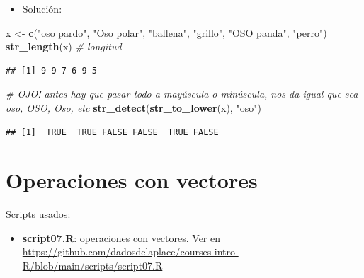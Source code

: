 \documentclass[11pt,]{book}
\newenvironment{Shaded}{\begin{snugshade}}{\end{snugshade}}
\newcommand{\CommentTok}[1]{\textcolor[rgb]{0.37,0.37,0.37}{\textit{#1}}}
\newcommand{\KeywordTok}[1]{\textcolor[rgb]{0.27,0.27,0.27}{\textbf{#1}}}
\newcommand{\NormalTok}[1]{#1}
\newcommand{\StringTok}[1]{\textcolor[rgb]{0.5,0.5,0.5}{#1}}
\providecommand{\tightlist}{%
  \setlength{\itemsep}{0pt}\setlength{\parskip}{0pt}}
\begin{document}
\begin{itemize}
\tightlist
\item
  Solución:
\end{itemize}

\begin{Shaded}
\begin{Highlighting}[]
\NormalTok{x <-}\StringTok{ }\KeywordTok{c}\NormalTok{(}\StringTok{"oso pardo"}\NormalTok{, }\StringTok{"Oso polar"}\NormalTok{, }\StringTok{"ballena"}\NormalTok{, }\StringTok{"grillo"}\NormalTok{, }\StringTok{"OSO panda"}\NormalTok{, }\StringTok{"perro"}\NormalTok{)}
\KeywordTok{str_length}\NormalTok{(x) }\CommentTok{# longitud}
\end{Highlighting}
\end{Shaded}

\begin{verbatim}
## [1] 9 9 7 6 9 5
\end{verbatim}

\begin{Shaded}
\begin{Highlighting}[]
\CommentTok{# OJO! antes hay que pasar todo a mayúscula o minúscula, nos da igual que sea oso, OSO, Oso, etc}
\KeywordTok{str_detect}\NormalTok{(}\KeywordTok{str_to_lower}\NormalTok{(x), }\StringTok{"oso"}\NormalTok{) }
\end{Highlighting}
\end{Shaded}

\begin{verbatim}
## [1]  TRUE  TRUE FALSE FALSE  TRUE FALSE
\end{verbatim}

\hypertarget{operaciones-con-vectores}{%
\section{Operaciones con vectores}\label{operaciones-con-vectores}}

\begin{blackbox}

Scripts usados:

\begin{itemize}
\tightlist
\item
  \href{https://github.com/dadosdelaplace/courses-intro-R/blob/main/scripts/script07.R}{\textbf{script07.R}}: operaciones con vectores. Ver en \url{https://github.com/dadosdelaplace/courses-intro-R/blob/main/scripts/script07.R}
\end{itemize}


\end{blackbox}
\end{document}
